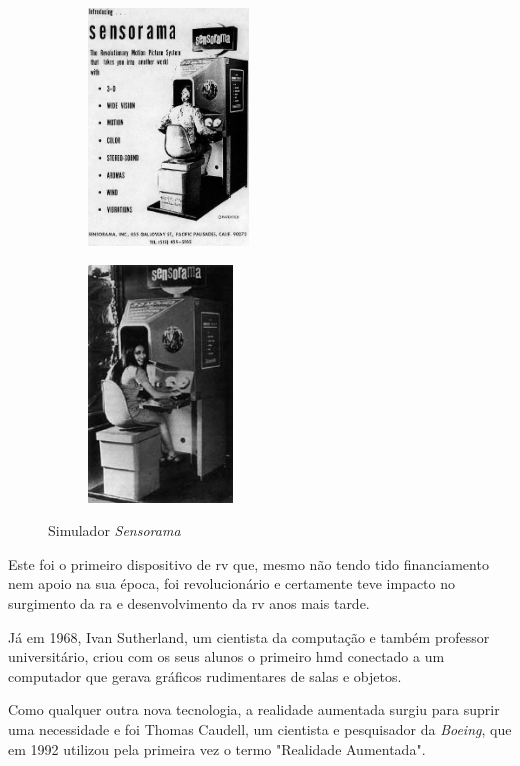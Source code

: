 \documentclass{report}
\begin{document}
\begin{figure}
    \centering
    \begin{subfigure}{.5\textwidth}
      \centering
      \includegraphics[height=17em]{sensorama.png}
      \label{Fig:sensorama0}
    \end{subfigure}%
    \begin{subfigure}{.5\textwidth}
      \centering
      \includegraphics[height=17em]{sensorama1.jpg}
      \label{Fig:sensorama1}
    \end{subfigure}
    \caption{Simulador \textit{Sensorama}}
    \label{Fig:sensorama}
\end{figure}

Este foi o primeiro dispositivo de \ac{rv} que, mesmo não tendo tido financiamento nem apoio na sua época, foi revolucionário e certamente teve impacto no surgimento da \ac{ra} e desenvolvimento da \ac{rv} anos mais tarde.

Já em 1968, Ivan Sutherland, um cientista da computação e também professor universitário, criou com os seus alunos o primeiro \ac{hmd} conectado a um computador que gerava gráficos rudimentares de salas e objetos.\cite{virtualrealitysociety_2020}

Como qualquer outra nova tecnologia, a realidade aumentada surgiu para suprir uma necessidade e foi Thomas Caudell, um cientista e pesquisador da \textit{Boeing}, que em 1992 utilizou pela primeira vez o termo "Realidade Aumentada".
\end{document}
